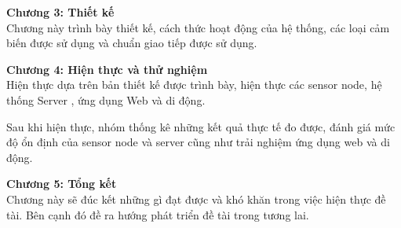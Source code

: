 \textbf{Chương 3: Thiết kế}\\
Chương này trình bày thiết kế, cách thức hoạt động của hệ thống, các loại cảm biến được sử dụng và chuẩn giao tiếp được sử dụng.

\textbf{Chương 4: Hiện thực và thử nghiệm}\\
Hiện thực dựa trên bản thiết kế được trình bày, hiện thực các sensor node, hệ thống Server , ứng dụng Web và di động.

Sau khi hiện thực, nhóm thống kê những kết quả thực tế đo được, đánh giá mức độ ổn định của sensor node và server cũng như trải nghiệm ứng dụng web và di động.

\textbf{Chương 5: Tổng kết}\\
Chương này sẽ đúc kết những gì đạt được và khó khăn trong việc hiện thực đề tài. Bên cạnh đó đề ra hướng phát triển đề tài trong tương lai.


